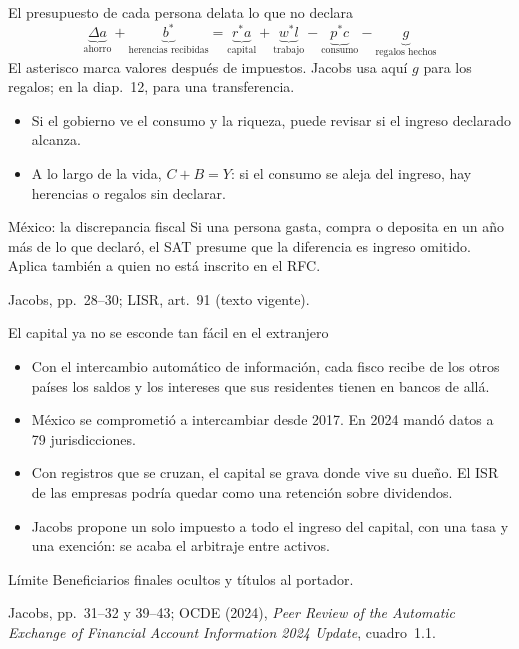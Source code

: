 \documentclass[aspectratio=169,11pt]{beamer}
\newcommand{\fuente}[1]{\par\vfill{\small\color{cGris}#1\par}}
\begin{document}
\begin{frame}{El presupuesto de cada persona delata lo que no declara}
  \[
    \underbrace{\Delta a}_{\text{ahorro}} + \underbrace{b^*}_{\text{herencias recibidas}} = \underbrace{r^*a}_{\text{capital}} + \underbrace{w^*l}_{\text{trabajo}} - \underbrace{p^*c}_{\text{consumo}} - \underbrace{g}_{\text{regalos hechos}}
  \]
  {\small\color{cGris}El asterisco marca valores después de impuestos. Jacobs usa aquí $g$ para los regalos; en la diap.~12, para una transferencia.}
  \begin{itemize}
    \item Si el gobierno ve el consumo y la riqueza, puede revisar si el ingreso declarado alcanza.
    \item A lo largo de la vida, $C + B = Y$: si el consumo se aleja del ingreso, hay herencias o regalos sin declarar.
  \end{itemize}
  \pause
  \begin{block}{México: la discrepancia fiscal}
    Si una persona gasta, compra o deposita en un año más de lo que declaró, el SAT presume que la diferencia es ingreso omitido. Aplica también a quien no está inscrito en el RFC.
  \end{block}
  \fuente{Jacobs, pp.~28--30; LISR, art.~91 (texto vigente).}
\end{frame}

\begin{frame}{El capital ya no se esconde tan fácil en el extranjero}
  \begin{itemize}
    \item Con el intercambio automático de información, cada fisco recibe de los otros países los saldos y los intereses que sus residentes tienen en bancos de allá.
    \item México se comprometió a intercambiar desde 2017. En 2024 mandó datos a 79 jurisdicciones.
  \end{itemize}
  \pause
  \begin{itemize}
    \item Con registros que se cruzan, el capital se grava donde vive su dueño. El ISR de las empresas podría quedar como una retención sobre dividendos.
    \item Jacobs propone un solo impuesto a todo el ingreso del capital, con una tasa y una exención: se acaba el arbitraje entre activos.
  \end{itemize}
  \pause
  \begin{block}{Límite}
    Beneficiarios finales ocultos y títulos al portador.
  \end{block}
  \fuente{Jacobs, pp.~31--32 y 39--43; OCDE (2024), \emph{Peer Review of the Automatic Exchange of Financial Account Information 2024 Update}, cuadro~1.1.}
\end{frame}
\end{document}
